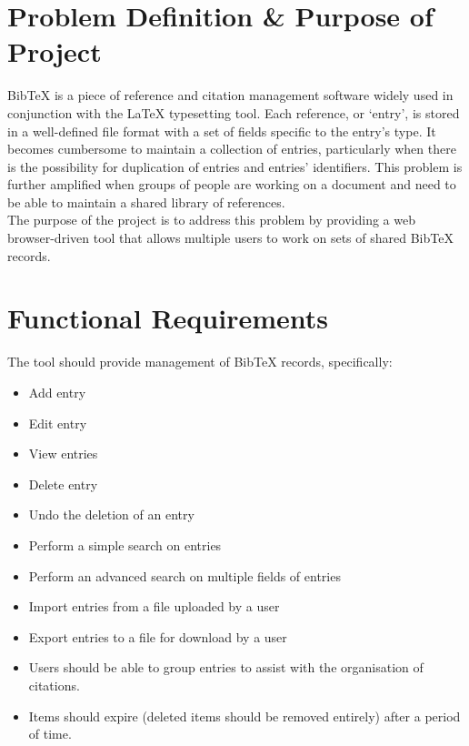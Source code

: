 \documentclass{l3proj}
\newcommand{\BibTeX}{B{\sc ib}\TeX}
\begin{document}
\section*{Problem Definition \& Purpose of Project}
\BibTeX{} is a piece of reference and citation management software widely used in conjunction with the LaTeX typesetting tool.  Each reference, or `entry', is stored in a well-defined file format with a set of fields specific to the entry's type. It becomes cumbersome to maintain a collection of entries, particularly when there is the possibility for duplication of entries and entries' identifiers.  This problem is further amplified when groups of people are working on a document and need to be able to maintain a shared library of references.\\
The purpose of the project is to address this problem by providing a web browser-driven tool that allows multiple users to work on sets of shared \BibTeX{} records.

\section*{Functional Requirements}
The tool should provide management of \BibTeX{} records, specifically:
\begin{itemize}
\item Add entry
\item Edit entry
\item View entries
\item Delete entry
\item Undo the deletion of an entry
\item Perform a simple search on entries
\item Perform an advanced search on multiple fields of entries
\item Import entries from a file uploaded by a user
\item Export entries to a file for download by a user
\item Users should be able to group entries to assist with the organisation of citations.
\item Items should expire (deleted items should be removed entirely) after a period of time.
\end{itemize}
\end{document}
